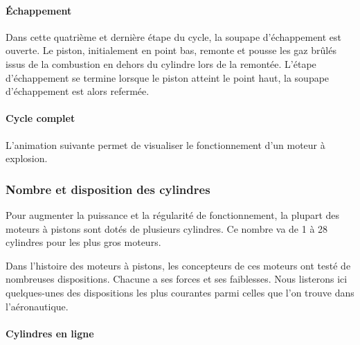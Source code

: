 		
		\paragraph{Échappement}
		
		Dans cette quatrième et dernière étape du cycle, la soupape d'échappement est ouverte. Le piston, initialement en point bas, remonte et pousse les gaz brûlés issus de la combustion en dehors du cylindre lors de la remontée. L'étape d'échappement se termine lorsque le piston atteint le point haut, la soupape d'échappement est alors refermée.
		
		\begin{figure}[H]
  		\centering
		
		\end{figure}	
		
		\paragraph{Cycle complet}
		
		L'animation suivante permet de visualiser le fonctionnement d'un moteur à explosion.	
		
		\renewcommand{\echelleTikz}{0.5}
		\begin{figure}[H]
  		\centering
		
		\end{figure}	
		
	\subsubsection{Nombre et disposition des cylindres}
	Pour augmenter la puissance et la régularité de fonctionnement, la plupart des moteurs à pistons sont dotés de plusieurs cylindres. Ce nombre va de 1 à 28 cylindres pour les plus gros moteurs.
	
	Dans l'histoire des moteurs à pistons, les concepteurs de ces moteurs ont testé de nombreuses dispositions. Chacune a ses forces et ses faiblesses. Nous listerons ici quelques-unes des dispositions les plus courantes parmi celles que l'on trouve dans l'aéronautique.
	
	\paragraph{Cylindres en ligne}
	
